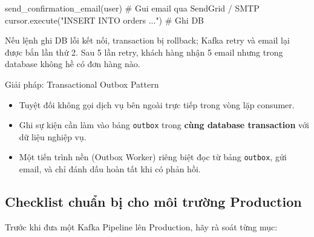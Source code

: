 \documentclass[12pt]{article}
\begin{document}
\begin{aivnpybox}
send_confirmation_email(user)               # Gui email qua SendGrid / SMTP
cursor.execute("INSERT INTO orders ...")    # Ghi DB
\end{aivnpybox}

Nếu lệnh ghi DB lỗi kết nối, transaction bị rollback; Kafka retry và email lại được bắn lần thứ 2. Sau 5 lần retry, khách hàng nhận 5 email nhưng trong database không hề có đơn hàng nào.

\begin{guidelinebox}{Giải pháp: Transactional Outbox Pattern}
\begin{itemize}
    \item Tuyệt đối không gọi dịch vụ bên ngoài trực tiếp trong vòng lặp consumer.
    \item Ghi sự kiện cần làm vào bảng \texttt{outbox} trong \textbf{cùng database transaction} với dữ liệu nghiệp vụ.
    \item Một tiến trình nền (Outbox Worker) riêng biệt đọc từ bảng \texttt{outbox}, gửi email, và chỉ đánh dấu hoàn tất khi có phản hồi.
\end{itemize}
\end{guidelinebox}

\subsection{Checklist chuẩn bị cho môi trường Production}

Trước khi đưa một Kafka Pipeline lên Production, hãy rà soát từng mục:
\end{document}
